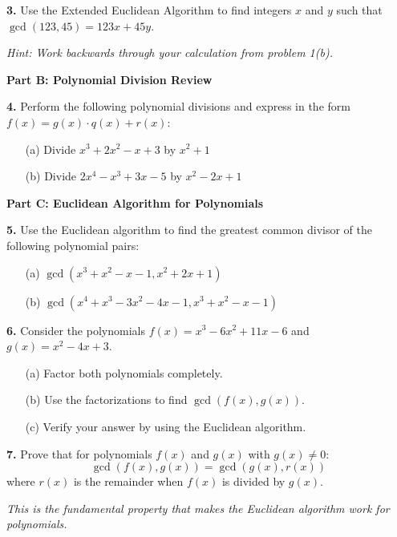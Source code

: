 \documentclass[12pt]{article}
\begin{document}
\textbf{3.} Use the Extended Euclidean Algorithm to find integers $x$ and $y$ such that $\gcd(123, 45) = 123x + 45y$.

\textit{Hint: Work backwards through your calculation from problem 1(b).}
\vspace{4cm}

\newpage

\textbf{Part B: Polynomial Division Review}

\textbf{4.} Perform the following polynomial divisions and express in the form $f(x) = g(x) \cdot q(x) + r(x)$:

\begin{enumerate}
\item[(a)] Divide $x^3 + 2x^2 - x + 3$ by $x^2 + 1$
\vspace{4cm}

\item[(b)] Divide $2x^4 - x^3 + 3x - 5$ by $x^2 - 2x + 1$
\vspace{4cm}
\end{enumerate}

\textbf{Part C: Euclidean Algorithm for Polynomials}

\textbf{5.} Use the Euclidean algorithm to find the greatest common divisor of the following polynomial pairs:

\begin{enumerate}
\item[(a)] $\gcd(x^3 + x^2 - x - 1, x^2 + 2x + 1)$
\vspace{5cm}

\item[(b)] $\gcd(x^4 + x^3 - 3x^2 - 4x - 1, x^3 + x^2 - x - 1)$
\vspace{6cm}
\end{enumerate}

\newpage

\textbf{6.} Consider the polynomials $f(x) = x^3 - 6x^2 + 11x - 6$ and $g(x) = x^2 - 4x + 3$.

\begin{enumerate}
\item[(a)] Factor both polynomials completely.
\vspace{3cm}

\item[(b)] Use the factorizations to find $\gcd(f(x), g(x))$.
\vspace{2cm}

\item[(c)] Verify your answer by using the Euclidean algorithm.
\vspace{4cm}
\end{enumerate}

\textbf{7.} Prove that for polynomials $f(x)$ and $g(x)$ with $g(x) \neq 0$:
$$\gcd(f(x), g(x)) = \gcd(g(x), r(x))$$
where $r(x)$ is the remainder when $f(x)$ is divided by $g(x)$.

\textit{This is the fundamental property that makes the Euclidean algorithm work for polynomials.}
\vspace{5cm}
\end{document}
